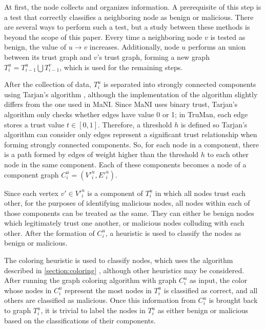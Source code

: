 At first, the node collects and organizes information.
A prerequisite of this step is a test that correctly classifies a neighboring node as benign or malicious.
There are several ways to perform such a test, but a study between these methods is beyond the scope of this paper.
Every time a neighboring node $v$ is tested as benign, the value of $u \rightarrow v$ increases.
Additionally, node $u$ performs an union between its trust graph and $v$'s trust graph, forming a new graph $T^u_i = T^u_{i-1} \bigcup T^v_{i-1}$, which is used for the remaining steps.

After the collection of data, $T^u_i$ is separated into strongly connected components using Tarjan's algorithm \citep{tarjan1972depth}, although the implementation of the algorithm slightly differs from the one used in MaNI.
Since MaNI uses binary trust, Tarjan's algorithm only checks whether edges have value 0 or 1; in TruMan, each edge stores a trust value $t \in [0, 1]$.%
Therefore, a threshold $h$ is defined so Tarjan's algorithm can consider only edges represent a significant trust relationship when forming strongly connected components.
So, for each node in a component, there is a path formed by edges of weight higher than the threshold $h$ to each other node in the same component.
Each of these components becomes a node of a component graph $C^u_i = (V'^u_i, E'^u_i)$.

Since each vertex $v' \in V'^u_i$ is a component of $T^u_i$ in which all nodes trust each other, for the purposes of identifying malicious nodes, all nodes within each of those components can be treated as the same.
They can either be benign nodes which legitimately trust one another, or malicious nodes colluding with each other.
After the formation of $C^u_i$, a heuristic is used to classify the nodes as benign or malicious.

The coloring heuristic is used to classify nodes, which uses the algorithm described in \autoref{section:coloring} \citep{mittal2011graph}, although other heuristics may be considered.
After running the graph coloring algorithm with graph $C^u_i$ as input, the color whose nodes in $C^u_i$ represent the most nodes in $T^u_i$ is classified as correct, and all others are classified as malicious.
Once this information from $C^u_i$ is brought back to graph $T^u_i$, it is trivial to label the nodes in $T^u_i$ as either benign or malicious based on the classifications of their components.

